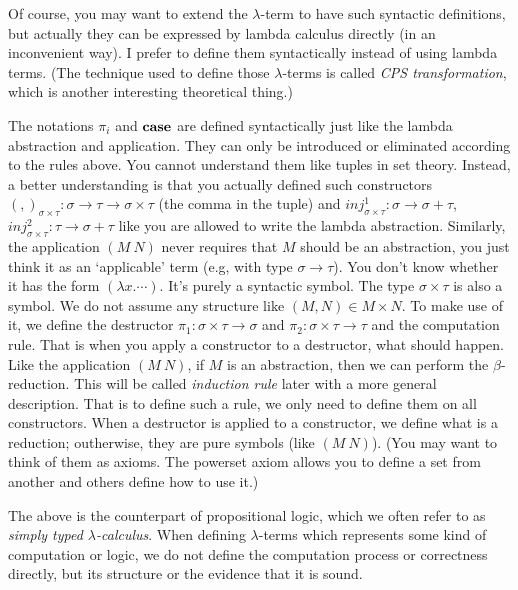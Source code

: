 Of course, you may want to extend the $\lambda$-term to have such
syntactic definitions, but actually they can be expressed by lambda
calculus directly \cite{Curry-Howard} (in an inconvenient way). 
I prefer to define them syntactically instead of using lambda terms.
(The technique used to define those $\lambda$-terms is called {\it CPS 
transformation}, which is another interesting theoretical thing.)

\begin{caveat}
    \label{constructor-destructor}
    The notations $\pi_i$ and $\text{\bf case}$ are defined syntactically
    just like the lambda abstraction and application. They can only be
    introduced or eliminated according to the rules above. You cannot
    understand them like tuples in set theory. Instead, a better
    understanding is that you actually defined such constructors 
    $(,)_{\sigma\times\tau}: \sigma\to\tau\to\sigma\times\tau$ (the comma
    in the tuple) and $inj^1_{\sigma\times\tau}: \sigma\to\sigma+\tau$, 
    $inj^2_{\sigma\times\tau}: \tau\to\sigma+\tau$ like you are allowed
    to write the lambda abstraction. Similarly, the application $(M\ N)$
    never requires that $M$ should be an abstraction, you just think it 
    as an `applicable' term (e.g, with type $\sigma\to\tau$). You don't 
    know whether it has the form $(\lambda x.\cdots)$. It's purely a
    syntactic symbol. The type $\sigma\times\tau$ is also a symbol. We
    do not assume any structure like $(M, N)\in M\times N$. To make
    use of it, we define the destructor $\pi_1:\sigma\times\tau\to\sigma$
    and $\pi_2:\sigma\times\tau\to\tau$ and the computation rule. That is
    when you apply a constructor to a destructor, what should happen.
    Like the application $(M\ N)$, if $M$ is an abstraction, then we can 
    perform the $\beta$-reduction. This will be called {\it induction 
    rule} later with a more general description. That is to define
    such a rule, we only need to define them on all constructors.
    When a destructor is applied to a constructor, we define what is a
    reduction; outherwise, they are pure symbols (like $(M\ N)$).
    (You may want to think of them as axioms. The powerset axiom allows 
    you to define a set from another and others define how to use it.)
\end{caveat}

The above is the counterpart of propositional logic, which we often
refer to as {\it simply typed $\lambda$-calculus}. When defining
$\lambda$-terms which represents some kind of computation or logic,
we do not define the computation process or correctness directly, but 
its structure or the evidence that it is sound. 

